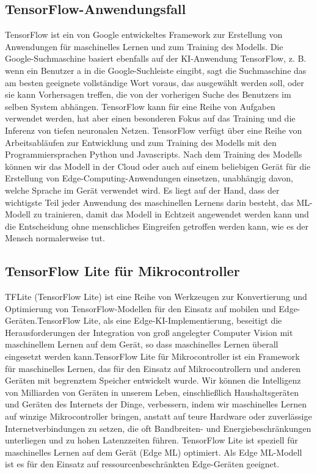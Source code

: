 \subsection{TensorFlow-Anwendungsfall}

TensorFlow ist ein von Google entwickeltes Framework zur Erstellung von Anwendungen für maschinelles Lernen und zum Training des Modells. Die Google-Suchmaschine basiert ebenfalls auf der KI-Anwendung TensorFlow, z. B. wenn ein Benutzer \glqq a\grqq{} in die Google-Suchleiste eingibt, sagt die Suchmaschine das am besten geeignete vollständige Wort voraus, das ausgewählt werden soll, oder sie kann Vorhersagen treffen, die von der vorherigen Suche des Benutzers im selben System abhängen. TensorFlow kann für eine Reihe von Aufgaben verwendet werden, hat aber einen besonderen Fokus auf das Training und die Inferenz von tiefen neuronalen Netzen. TensorFlow verfügt über eine Reihe von Arbeitsabläufen zur Entwicklung und zum Training des Modells mit den Programmiersprachen Python und Javascripts. Nach dem Training des Modells können wir das Modell in der Cloud oder auch auf einem beliebigen Gerät für die Erstellung von Edge-Computing-Anwendungen einsetzen, unabhängig davon, welche Sprache im Gerät verwendet wird. Es liegt auf der Hand, dass der wichtigste Teil jeder Anwendung des maschinellen Lernens darin besteht, das ML-Modell zu trainieren, damit das Modell in Echtzeit angewendet werden kann und die Entscheidung ohne menschliches Eingreifen getroffen werden kann, wie es der Mensch normalerweise tut. 

\subsection{TensorFlow Lite für Mikrocontroller}

TFLite (TensorFlow Lite) ist eine Reihe von Werkzeugen zur Konvertierung und Optimierung von TensorFlow-Modellen für den Einsatz auf mobilen und Edge-Geräten.TensorFlow Lite, als eine Edge-KI-Implementierung, beseitigt die Herausforderungen der Integration von groß angelegter Computer Vision mit maschinellem Lernen auf dem Gerät, so dass maschinelles Lernen überall eingesetzt werden kann.TensorFlow Lite für Mikrocontroller ist ein Framework für maschinelles Lernen, das für den Einsatz auf Mikrocontrollern und anderen Geräten mit begrenztem Speicher entwickelt wurde. Wir können die Intelligenz von Milliarden von Geräten in unserem Leben, einschließlich Haushaltsgeräten und Geräten des Internets der Dinge, verbessern, indem wir maschinelles Lernen auf winzige Mikrocontroller bringen, anstatt auf teure Hardware oder zuverlässige Internetverbindungen zu setzen, die oft Bandbreiten- und Energiebeschränkungen unterliegen und zu hohen Latenzzeiten führen. TensorFlow Lite ist speziell für maschinelles Lernen auf dem Gerät (Edge ML) optimiert. Als Edge ML-Modell ist es für den Einsatz auf ressourcenbeschränkten Edge-Geräten geeignet. \cite{GoogleTensorFlowLite:2021,Dokic:2020}



